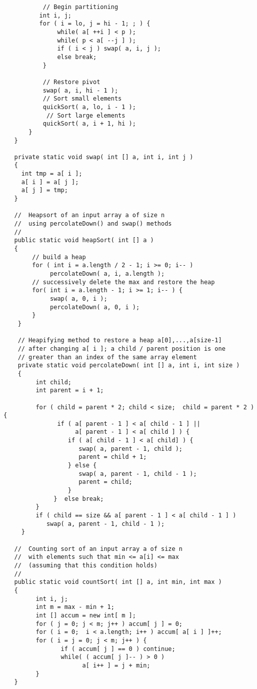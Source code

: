 {\begin{verbatim}
           // Begin partitioning 
          int i, j; 
          for ( i = lo, j = hi - 1; ; ) { 
               while( a[ ++i ] < p ); 
               while( p < a[ --j ] ); 
               if ( i < j ) swap( a, i, j ); 
               else break; 
           } 
 
           // Restore pivot 
           swap( a, i, hi - 1 ); 
           // Sort small elements
           quickSort( a, lo, i - 1 );
            // Sort large elements
           quickSort( a, i + 1, hi ); 
       } 
   } 
  
   private static void swap( int [] a, int i, int j ) 
   { 
     int tmp = a[ i ]; 
     a[ i ] = a[ j ]; 
     a[ j ] = tmp; 
   } 
 
   //  Heapsort of an input array a of size n
   //  using percolateDown() and swap() methods
   //
   public static void heapSort( int [] a ) 
   { 
        // build a heap 
        for ( int i = a.length / 2 - 1; i >= 0; i-- )
             percolateDown( a, i, a.length ); 
        // successively delete the max and restore the heap
        for( int i = a.length - 1; i >= 1; i-- ) { 
             swap( a, 0, i ); 
             percolateDown( a, 0, i ); 
        } 
    } 
	
    // Heapifying method to restore a heap a[0],...,a[size-1]
    // after changing a[ i ]; a child / parent position is one
    // greater than an index of the same array element
    private static void percolateDown( int [] a, int i, int size ) 
    { 
         int child;
         int parent = i + 1; 
     
         for ( child = parent * 2; child < size;  child = parent * 2 ) {	 
               if ( a[ parent - 1 ] < a[ child - 1 ] || 
                    a[ parent - 1 ] < a[ child ] ) {  
                  if ( a[ child - 1 ] < a[ child] ) { 
                     swap( a, parent - 1, child ); 
                     parent = child + 1; 
                  } else { 
                     swap( a, parent - 1, child - 1 ); 
                     parent = child; 
                  } 
              }  else break; 
         } 
         if ( child == size && a[ parent - 1 ] < a[ child - 1 ] ) 
            swap( a, parent - 1, child - 1 ); 
     } 
     
   //  Counting sort of an input array a of size n
   //  with elements such that min <= a[i] <= max 
   //  (assuming that this condition holds)
   //
   public static void countSort( int [] a, int min, int max ) 
   {
         int i, j;
         int m = max - min + 1;
         int [] accum = new int[ m ];
         for ( j = 0; j < m; j++ ) accum[ j ] = 0;
         for ( i = 0;  i < a.length; i++ ) accum[ a[ i ] ]++;
         for ( i = j = 0; j < m; j++ ) {
                if ( accum[ j ] == 0 ) continue;
                while( ( accum[ j ]-- ) > 0 )
                      a[ i++ ] = j + min;
         }     
   }
\end{verbatim}%
}%

